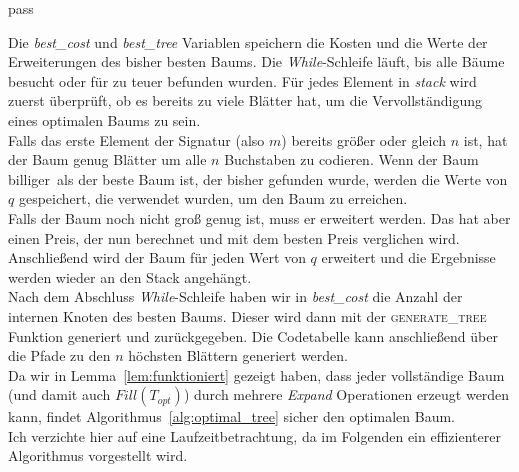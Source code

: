 pass\documentclass[a4paper,10pt,ngerman]{scrartcl}
\begin{document}
    Die \textit{best\_cost} und \textit{best\_tree} Variablen speichern die Kosten und die Werte der Erweiterungen des bisher besten Baums.
    Die \textit{While}-Schleife läuft, bis alle Bäume besucht oder für zu teuer befunden wurden.
    Für jedes Element in \textit{stack} wird zuerst überprüft, ob es bereits zu viele Blätter hat, um die Vervollständigung eines optimalen Baums zu sein.\\
    Falls das erste Element der Signatur (also $m$) bereits größer oder gleich $n$ ist, hat der Baum genug Blätter um alle $n$ Buchstaben zu codieren.
    Wenn der Baum \glqq billiger\grqq~als der beste Baum ist, der bisher gefunden wurde, werden die Werte von $q$ gespeichert, die verwendet wurden, um den Baum zu erreichen. \\
    Falls der Baum noch nicht groß genug ist, muss er erweitert werden.
    Das hat aber einen Preis, der nun berechnet und mit dem besten Preis verglichen wird. \\
    Anschließend wird der Baum für jeden Wert von $q$ erweitert und die Ergebnisse werden wieder an den Stack angehängt. \\
    Nach dem Abschluss \textit{While}-Schleife haben wir in \textit{best\_cost} die Anzahl der internen Knoten des besten Baums.
    Dieser wird dann mit der \textsc{generate\_tree} Funktion generiert und zurückgegeben.
    Die Codetabelle kann anschließend über die Pfade zu den $n$ höchsten Blättern generiert werden. \\
    Da wir in Lemma~\ref{lem:funktioniert} gezeigt haben, dass jeder vollständige Baum (und damit auch $Fill(T_{opt})$) durch mehrere \textit{Expand} Operationen erzeugt werden kann, findet Algorithmus~\ref{alg:optimal_tree} sicher den optimalen Baum. \\
    Ich verzichte hier auf eine Laufzeitbetrachtung, da im Folgenden ein effizienterer Algorithmus vorgestellt wird.
\end{document}
